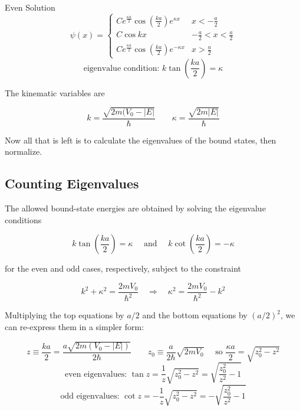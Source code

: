 \begin{subbox}{Even Solution}
\[
  \psi(x) = \begin{cases}
    Ce^{\frac{\kappa a}{2}} \cos (\frac{ka}{2}) e^{\kappa x}
      &x < -\frac{a}{2} \\ C \cos kx   &-\frac{a}{2}
    < x < \frac{a}{2} \\ Ce^{\frac{\kappa a }{2}} \cos (\frac{ka}{2})
    e^{-\kappa x}   &x > \frac{a}{2}
  \end{cases}
\]
\[ \text{eigenvalue condition: } k \tan \left( \frac{ka}{2} \right) = \kappa \]
\end{subbox}



The kinematic variables are 

\[
k = \frac{\sqrt{2m(V_0 - |E|}}{\hbar} \qquad \kappa = \frac{\sqrt{2m|E|}}{\hbar}
\] \vspace{3px}

Now all that is left is to calculate the eigenvalues of the bound states, then
normalize. 

\subsection{Counting Eigenvalues}

The allowed bound-state energies are
obtained by solving the eigenvalue conditions 

\[
k\tan\left( \frac{ka}{2} \right) = \kappa \quad \text{ and } \quad k \cot
\left( \frac{ka}{2} \right) = -\kappa   
\] \vspace{3px}

for the even and odd cases, respectively, subject to the constraint 

\[
k^2 + \kappa^2 = \frac{2mV_0}{\hbar^2} \quad \Rightarrow \quad \kappa^2
= \frac{2mV_0}{\hbar^2} - k^2
\] \vspace{3px}

Multiplying the top equations by $a/2$ and the bottom equations by $ (a/2)^2$,
we can re-express them in a simpler form: 

\begin{mainbox}{}
  \[z \equiv \frac{ka}{2} = \frac{a\sqrt{2m(V_0 - |E|)}}{2\hbar} \qquad z_0
  \equiv \frac{a}{2\hbar}\sqrt{2mV_0} \quad \text{ so } \frac{\kappa a}{2}
= \sqrt{z_0^2 - z^2}\]
\[ \text{even eigenvalues: }  \tan z = \frac{1}{z} \sqrt{z_0^2 - z^2}
  = \sqrt{\frac{z_0^2}{z^2} - 1}\] \[ \text{odd eigenvalues: } \cot
z = -\frac{1}{z} \sqrt{z_0^2 - z^2} = -\sqrt{\frac{z_0^2}{z^2} - 1}\]  
\end{mainbox}


